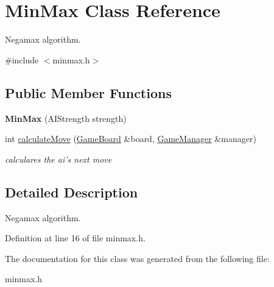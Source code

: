 \hypertarget{class_min_max}{\section{Min\-Max Class Reference}
\label{class_min_max}
}


Negamax algorithm.  




{\ttfamily \#include $<$minmax.\-h$>$}

\subsection*{Public Member Functions}
\begin{DoxyCompactItemize}
\item 
\hypertarget{class_min_max_ad5d3439e2da6bdec672b4e068c86f219}{{\bfseries Min\-Max} (A\-I\-Strength strength)}\label{class_min_max_ad5d3439e2da6bdec672b4e068c86f219}

\item 
\hypertarget{class_min_max_a0727d40296556cb72e6b147796e9cb06}{int \hyperlink{class_min_max_a0727d40296556cb72e6b147796e9cb06}{calculate\-Move} (\hyperlink{class_game_board}{Game\-Board} \&board, \hyperlink{class_game_manager}{Game\-Manager} \&manager)}\label{class_min_max_a0727d40296556cb72e6b147796e9cb06}

\begin{DoxyCompactList}\small\item\em calculares the ai's next move \end{DoxyCompactList}\end{DoxyCompactItemize}


\subsection{Detailed Description}
Negamax algorithm. 

Definition at line 16 of file minmax.\-h.



The documentation for this class was generated from the following file\-:\begin{DoxyCompactItemize}
\item 
minmax.\-h\end{DoxyCompactItemize}
